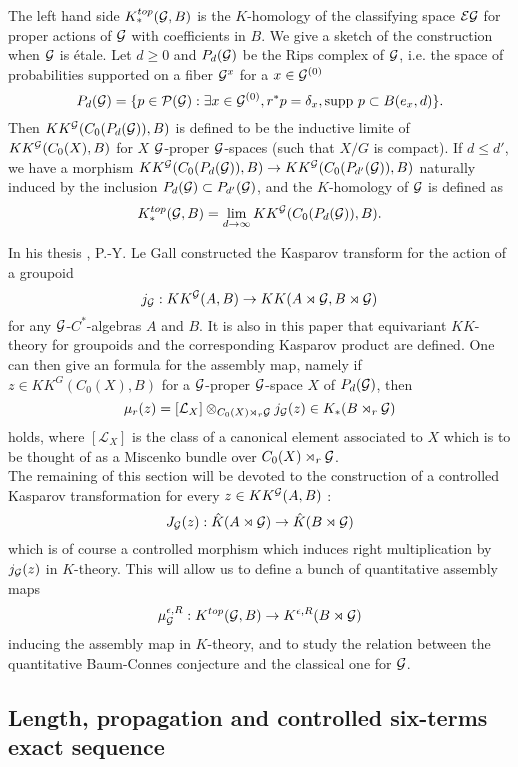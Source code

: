 The left hand side $K^{top}_*(\mathcal G,B)$ is the $K$-homology of the classifying space $\mathcal E \mathcal G$ for proper actions of $\mathcal G$ with coefficients in $B$. We give a sketch of the construction when $\mathcal G$ is étale. Let $d\geq 0$ and $P_d(\mathcal G)$ be the Rips complex of $\mathcal G$, i.e. the space of probabilities supported on a fiber $\mathcal G^x$ for a $x\in \mathcal G^{(0)}$
\[P_d(\mathcal G) = \{p\in \mathcal P(\mathcal G) : \exists x\in \mathcal G^{(0)}, r^*p=\delta_x, \text{supp }p \subset B(e_x,d)\}.\]
Then $KK^\mathcal G( C_0(P_d(\mathcal G)),B)$ is defined to be the inductive limite of $KK^\mathcal G( C_0(X),B)$ for $X$ $\mathcal G$-proper $\mathcal G$-spaces (such that $X/G$ is compact). If $d\leq d'$, we have a morphism $KK^\mathcal G( C_0(P_d(\mathcal G)),B)\rightarrow KK^\mathcal G( C_0(P_{d'}(\mathcal G)),B)$ naturally induced by the inclusion $P_d(\mathcal G)\subset P_{d'}(\mathcal G)$, and the $K$-homology of $\mathcal G$ is defined as
\[K^{top}_*(\mathcal G,B)=\lim_{d\rightarrow \infty} KK^\mathcal G( C_0(P_d(\mathcal G)),B).\]

In his thesis \cite{LeGall}, P.-Y. Le Gall constructed the Kasparov transform for the action of a groupoid
\[j_\mathcal G : KK^\mathcal G(A,B)\rightarrow KK(A\rtimes \mathcal G,B\rtimes \mathcal G)\]
for any $\mathcal G$-$C^*$-algebras $A$ and $B$. It is also in this paper that equivariant $KK$-theory for groupoids and the corresponding Kasparov product are defined. One can then give an formula for the assembly map, namely if $z\in KK^G(C_0(X),B)$ for a $\mathcal G$-proper $\mathcal G$-space $X$ of $P_d(\mathcal G)$, then
\[\mu_r(z)=[\mathcal L_X]\otimes_{C_0(X)\rtimes_r \mathcal G} j_\mathcal G(z) \in K_*(B\rtimes_r \mathcal G) \]
holds, where $[\mathcal L_X]$ is the class of a canonical element associated to $X$ which is to be thought of as a Miscenko bundle over $C_0(X)\rtimes_r \mathcal G$.\\

The remaining of this section will be devoted to the construction of a controlled Kasparov transformation for every $z\in KK^\mathcal G(A,B)$ :
\[J_\mathcal G(z) : \hat K(A\rtimes \mathcal G)\rightarrow \hat K(B\rtimes \mathcal G)\] 
which is of course a controlled morphism which induces right multiplication by $j_\mathcal G(z)$ in $K$-theory. This will allow us to define a bunch of quantitative assembly maps
\[\mu_\mathcal G^{\epsilon, R}: K^{top}(\mathcal G,B)\rightarrow K^{\epsilon,R}(B\rtimes \mathcal G)\]
inducing the assembly map in $K$-theory, and to study the relation between the quantitative Baum-Connes conjecture and the classical one for $\mathcal G$.

\subsection{Length, propagation and controlled six-terms exact sequence}

